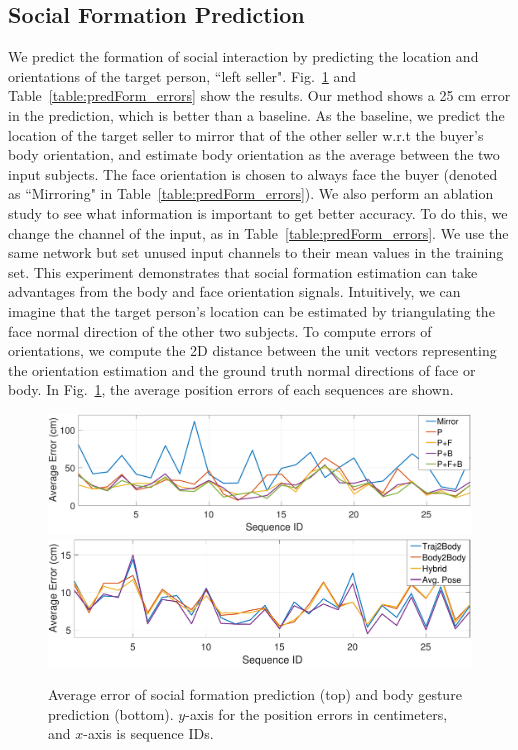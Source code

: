 \subsection{Social Formation Prediction}
We predict the formation of social interaction by predicting the location and orientations of the target person, ``left seller". Fig.~\ref{fig:predForm_errors} and Table~\ref{table:predForm_errors} show the results. Our method shows a 25 cm error in the prediction, which is better than a baseline. As the baseline, we predict the location of the target seller to mirror that of the other seller w.r.t the buyer's body orientation, and estimate body orientation as the average between the two input subjects. The face orientation is chosen to always face the buyer (denoted as ``Mirroring" in Table~\ref{table:predForm_errors}). We also perform an ablation study to see what information is important to get better accuracy. To do this, we change the channel of the input, as in Table~\ref{table:predForm_errors}. We use the same network  but set unused input channels to their mean values in the training set. This experiment demonstrates that social formation estimation can take advantages from the body and face orientation signals. Intuitively, we can imagine that the target person's location can be estimated by triangulating the face normal direction of the other two subjects. To compute errors of orientations, we compute the 2D distance between the unit vectors representing the orientation estimation and the ground truth normal directions of face or body. In Fig.~\ref{fig:predForm_errors}, the average position errors of each sequences are shown. 

\begin{figure}
	\centering
	\includegraphics[width=\linewidth]{ssp_fig/cvpr19_predForm}\\
	\includegraphics[width=\linewidth]{ssp_fig/cvpr19_predBody}
	\caption{Average error of social formation prediction (top) and body gesture prediction (bottom). $y$-axis for the position errors in centimeters, and $x$-axis is sequence IDs.} %
	\label{fig:predForm_errors}
\end{figure}


